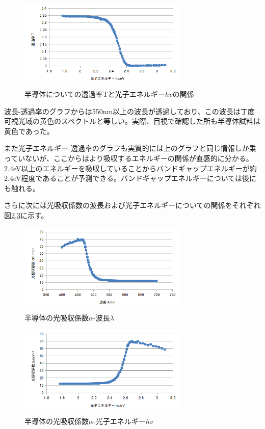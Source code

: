 \documentclass[11pt,a4j]{jsarticle}
\begin{document}
 \begin{figure}[htbp]
  \centering
  \includegraphics[width=8cm,clip]{1_2_T-hv.png}
  \caption{半導体についての透過率Tと光子エネルギー$hv$の関係}
  \label{fig:T-hv}
 \end{figure}%
 
 波長-透過率のグラフからは550nm以上の波長が透過しており、この波長は丁度可視光域の黄色のスペクトルと等しい。実際、目視で確認した所も半導体試料は黄色であった。
 
 また光子エネルギー-透過率のグラフも実質的には上のグラフと同じ情報しか乗っていないが、ここからはより吸収するエネルギーの関係が直感的に分かる。2.4eV以上のエネルギーを吸収していることからバンドギャップエネルギーが約2.4eV程度であることが予測できる。バンドギャップエネルギーについては後にも触れる。
  
  さらに次には光吸収係数の波長および光子エネルギーについての関係をそれぞれ図\ref{fig:alpha-lambda},\ref{fig:alpha-hv}に示す。
 
 \begin{figure}[htbp]
  \centering
  \includegraphics[width=8cm,clip]{1_2_alpha-lambda.png}
  \caption{半導体の光吸収係数$\alpha$-波長$\lambda$}
  \label{fig:alpha-lambda}
 \end{figure}%
 
 \begin{figure}[htbp]
  \centering
  \includegraphics[width=8cm,clip]{1_2_alpha-hv.png}
  \caption{半導体の光吸収係数$\alpha$-光子エネルギー$hv$}
  \label{fig:alpha-hv}
 \end{figure}%
 
\end{document}
